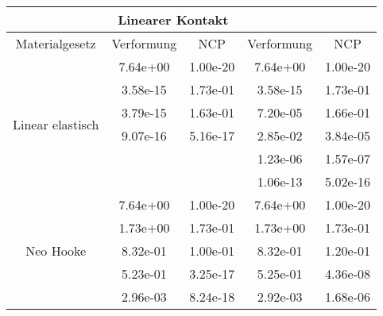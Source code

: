 \begin{table} 
\centering 
\begin{tabular}{c|cc|cc|} 
\cline{2-5} 
 & \multicolumn{2}{|c|}{Linearer Kontakt} &  \\ 
\hline 
\multicolumn{1}{|c|}{Materialgesetz} & \multicolumn{1}{c|}{Verformung} & \multicolumn{1}{c|}{NCP} & \multicolumn{1}{c|}{Verformung} & \multicolumn{1}{c|}{NCP} \\ 
\hline 
\multicolumn{1}{|c|}{\multirow{6}{*}{Linear elastisch}} &\multicolumn{1}{|c|}{  7.64e+00} & \multicolumn{1}{|c|}{  1.00e-20} & \multicolumn{1}{|c|}{  7.64e+00} & \multicolumn{1}{|c|}{  1.00e-20} \\ 
\multicolumn{1}{|c|}{} & \multicolumn{1}{|c|}{  3.58e-15} & \multicolumn{1}{|c|}{  1.73e-01} & \multicolumn{1}{|c|}{  3.58e-15} & \multicolumn{1}{|c|}{  1.73e-01} \\ 
\multicolumn{1}{|c|}{} & \multicolumn{1}{|c|}{  3.79e-15} & \multicolumn{1}{|c|}{  1.63e-01} & \multicolumn{1}{|c|}{  7.20e-05} & \multicolumn{1}{|c|}{  1.66e-01} \\ 
\multicolumn{1}{|c|}{} & \multicolumn{1}{|c|}{  9.07e-16} & \multicolumn{1}{|c|}{  5.16e-17} & \multicolumn{1}{|c|}{  2.85e-02} & \multicolumn{1}{|c|}{  3.84e-05} \\ 
\multicolumn{1}{|c|}{} & \multicolumn{1}{|c|}{} & \multicolumn{1}{|c|}{} & \multicolumn{1}{|c|}{  1.23e-06} & \multicolumn{1}{|c|}{  1.57e-07} \\ 
\multicolumn{1}{|c|}{} & \multicolumn{1}{|c|}{} & \multicolumn{1}{|c|}{} & \multicolumn{1}{|c|}{  1.06e-13} & \multicolumn{1}{|c|}{  5.02e-16} \\ 
\hline 
\multicolumn{1}{|c|}{\multirow{7}{*}{Neo Hooke}} &\multicolumn{1}{|c|}{  7.64e+00} & \multicolumn{1}{|c|}{  1.00e-20} & \multicolumn{1}{|c|}{  7.64e+00} & \multicolumn{1}{|c|}{  1.00e-20} \\ 
\multicolumn{1}{|c|}{} & \multicolumn{1}{|c|}{  1.73e+00} & \multicolumn{1}{|c|}{  1.73e-01} & \multicolumn{1}{|c|}{  1.73e+00} & \multicolumn{1}{|c|}{  1.73e-01} \\ 
\multicolumn{1}{|c|}{} & \multicolumn{1}{|c|}{  8.32e-01} & \multicolumn{1}{|c|}{  1.00e-01} & \multicolumn{1}{|c|}{  8.32e-01} & \multicolumn{1}{|c|}{  1.20e-01} \\ 
\multicolumn{1}{|c|}{} & \multicolumn{1}{|c|}{  5.23e-01} & \multicolumn{1}{|c|}{  3.25e-17} & \multicolumn{1}{|c|}{  5.25e-01} & \multicolumn{1}{|c|}{  4.36e-08} \\ 
\multicolumn{1}{|c|}{} & \multicolumn{1}{|c|}{  2.96e-03} & \multicolumn{1}{|c|}{  8.24e-18} & \multicolumn{1}{|c|}{  2.92e-03} & \multicolumn{1}{|c|}{  1.68e-06} \\ 

\end{tabular}
\end{table}
